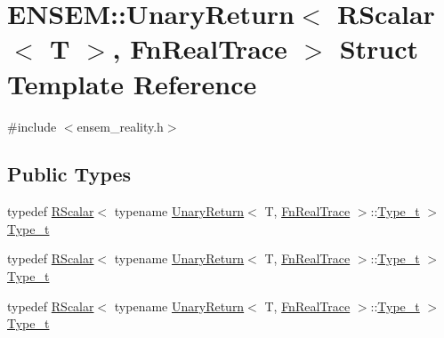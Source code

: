 \hypertarget{structENSEM_1_1UnaryReturn_3_01RScalar_3_01T_01_4_00_01FnRealTrace_01_4}{}\section{E\+N\+S\+EM\+:\+:Unary\+Return$<$ R\+Scalar$<$ T $>$, Fn\+Real\+Trace $>$ Struct Template Reference}
\label{structENSEM_1_1UnaryReturn_3_01RScalar_3_01T_01_4_00_01FnRealTrace_01_4}


{\ttfamily \#include $<$ensem\+\_\+reality.\+h$>$}

\subsection*{Public Types}
\begin{DoxyCompactItemize}
\item 
typedef \mbox{\hyperlink{classENSEM_1_1RScalar}{R\+Scalar}}$<$ typename \mbox{\hyperlink{structENSEM_1_1UnaryReturn}{Unary\+Return}}$<$ T, \mbox{\hyperlink{structENSEM_1_1FnRealTrace}{Fn\+Real\+Trace}} $>$\+::\mbox{\hyperlink{structENSEM_1_1UnaryReturn_3_01RScalar_3_01T_01_4_00_01FnRealTrace_01_4_a686ea10aaa6f33a08566c94481d3e172}{Type\+\_\+t}} $>$ \mbox{\hyperlink{structENSEM_1_1UnaryReturn_3_01RScalar_3_01T_01_4_00_01FnRealTrace_01_4_a686ea10aaa6f33a08566c94481d3e172}{Type\+\_\+t}}
\item 
typedef \mbox{\hyperlink{classENSEM_1_1RScalar}{R\+Scalar}}$<$ typename \mbox{\hyperlink{structENSEM_1_1UnaryReturn}{Unary\+Return}}$<$ T, \mbox{\hyperlink{structENSEM_1_1FnRealTrace}{Fn\+Real\+Trace}} $>$\+::\mbox{\hyperlink{structENSEM_1_1UnaryReturn_3_01RScalar_3_01T_01_4_00_01FnRealTrace_01_4_a686ea10aaa6f33a08566c94481d3e172}{Type\+\_\+t}} $>$ \mbox{\hyperlink{structENSEM_1_1UnaryReturn_3_01RScalar_3_01T_01_4_00_01FnRealTrace_01_4_a686ea10aaa6f33a08566c94481d3e172}{Type\+\_\+t}}
\item 
typedef \mbox{\hyperlink{classENSEM_1_1RScalar}{R\+Scalar}}$<$ typename \mbox{\hyperlink{structENSEM_1_1UnaryReturn}{Unary\+Return}}$<$ T, \mbox{\hyperlink{structENSEM_1_1FnRealTrace}{Fn\+Real\+Trace}} $>$\+::\mbox{\hyperlink{structENSEM_1_1UnaryReturn_3_01RScalar_3_01T_01_4_00_01FnRealTrace_01_4_a686ea10aaa6f33a08566c94481d3e172}{Type\+\_\+t}} $>$ \mbox{\hyperlink{structENSEM_1_1UnaryReturn_3_01RScalar_3_01T_01_4_00_01FnRealTrace_01_4_a686ea10aaa6f33a08566c94481d3e172}{Type\+\_\+t}}
\end{DoxyCompactItemize}


